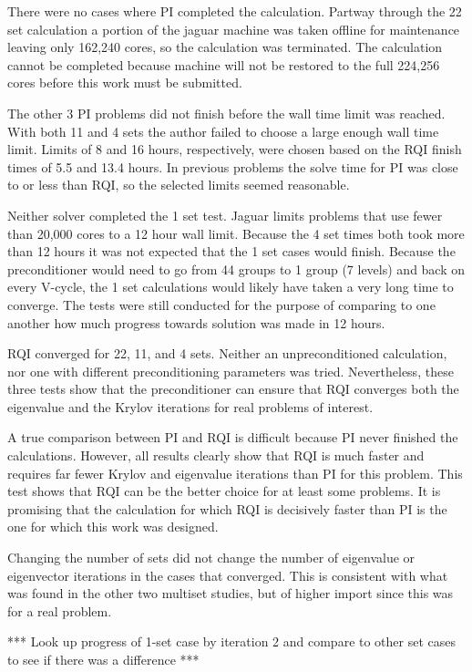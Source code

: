 There were no cases where PI completed the calculation. Partway through the 22 set calculation a portion of the jaguar machine was taken offline for maintenance leaving only 162,240 cores, so the calculation was terminated. The calculation cannot be completed because machine will not be restored to the full 224,256 cores before this work must be submitted. 

The other 3 PI problems did not finish before the wall time limit was reached. With both 11 and 4 sets the author failed to choose a large enough wall time limit. Limits of 8 and 16 hours, respectively, were chosen based on the RQI finish times of 5.5 and 13.4 hours. In previous problems the solve time for PI was close to or less than RQI, so the selected limits seemed reasonable. 

Neither solver completed the 1 set test. Jaguar limits problems that use fewer than 20,000 cores to a 12 hour wall limit. Because the 4 set times both took more than 12 hours it was not expected that the 1 set cases would finish. Because the preconditioner would need to go from 44 groups to 1 group (7 levels) and back on every V-cycle, the 1 set calculations would likely have taken a very long time to converge. The tests were still conducted for the purpose of comparing to one another how much progress towards solution was made in 12 hours. 

RQI converged for 22, 11, and 4 sets. Neither an unpreconditioned calculation, nor one with different preconditioning parameters was tried. Nevertheless, these three tests show that the preconditioner can ensure that RQI converges both the eigenvalue and the Krylov iterations for real problems of interest. 

A true comparison between PI and RQI is difficult because PI never finished the calculations. However, all results clearly show that RQI is much faster and requires far fewer Krylov and eigenvalue iterations than PI for this problem. This test shows that RQI can be the better choice for at least some problems. It is promising that the calculation for which RQI is decisively faster than PI is the one for which this work was designed. 

Changing the number of sets did not change the number of eigenvalue or eigenvector iterations in the cases that converged. This is consistent with what was found in the other two multiset studies, but of higher import since this was for a real problem.

*** Look up progress of 1-set case by iteration 2 and compare to other set cases to see if there was a difference ***

